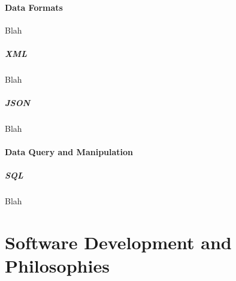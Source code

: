 \subsection{Data Formats}

Blah

\subsubsection{XML}

Blah

\subsubsection{JSON}

Blah


\subsection{Data Query and Manipulation}

\subsubsection{SQL}

Blah \\

\newpage


\part*{Software Development and Philosophies}



